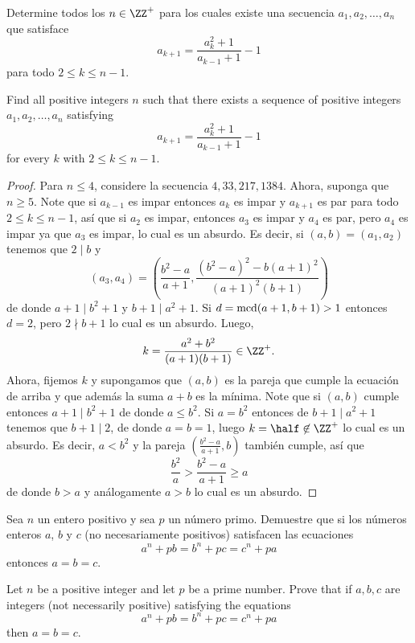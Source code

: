 \begin{probEG}[ISL 2009/N4]
  Determine todos los $n\in\ZZ^+$ para los cuales existe una secuencia
  $a_1,a_2,\dots,a_n$ que satisface
  \[a_{k+1}=\frac{a_k^2+1}{a_{k-1}+1}-1\]
  para todo $2\le k\le n-1$.
  \begin{hint}
    Find all positive integers $n$ such that there exists a sequence of positive
    integers $a_1,a_2,\dots,a_n$ satisfying
    \[a_{k+1}=\frac{a_k^2+1}{a_{k-1}+1}-1\]
    for every $k$ with $2\le k\le n-1$.
  \end{hint}
\end{probEG}

\begin{proof}
  Para $n\le 4$, considere la secuencia $4,33,217,1384$. Ahora, suponga que
  $n\ge 5$. Note que si $a_{k-1}$ es impar entonces $a_k$ es impar y $a_{k+1}$
  es par para todo $2\le k\le n-1$, así que si $a_2$ es impar, entonces $a_3$ es
  impar y $a_4$ es par, pero $a_4$ es impar ya que $a_3$ es impar, lo cual es un
  absurdo. Es decir, si $(a,b)=(a_1,a_2)$ tenemos que $2\mid b$ y
  \[
    (a_3,a_4)
    =\left(\frac{b^2-a}{a+1},\frac{(b^2-a)^2-b(a+1)^2}{(a+1)^2(b+1)}\right)
  \]
  de donde $a+1\mid b^2+1$ y $b+1\mid a^2+1$. Si $d=\operatorname{mcd}(a+1,b+1)>1$ entonces
  $d=2$, pero $2\nmid b+1$ lo cual es un absurdo. Luego,
  \[k=\frac{a^2+b^2}{(a+1)(b+1)}\in\ZZ^+.\]
  Ahora, fijemos $k$ y supongamos que $(a,b)$ es la pareja que cumple la
  ecuación de arriba y que además la suma $a+b$ es la mínima. Note que si
  $(a,b)$ cumple entonces $a+1\mid b^2+1$ de donde $a\le b^2$. Si $a=b^2$
  entonces de $b+1\mid a^2+1$ tenemos que $b+1\mid 2$, de donde $a=b=1$, luego
  $k=\half\not\in\ZZ^+$ lo cual es un absurdo. Es decir, $a<b^2$ y la pareja
  $\left(\frac{b^2-a}{a+1},b\right)$ también cumple, así que
  \[\frac{b^2}{a}>\frac{b^2-a}{a+1}\ge a\]
  de donde $b>a$ y análogamente $a>b$ lo cual es un absurdo.
\end{proof}

\begin{probEB}[ISL 2008/N1]
  Sea $n$ un entero positivo y sea $p$ un número primo. Demuestre que si los
  números enteros $a$, $b$ y $c$ (no necesariamente positivos) satisfacen las
  ecuaciones
  \[a^n+pb=b^n+pc=c^n+pa\]
  entonces $a=b=c$.
  \begin{hint}
    Let $n$ be a positive integer and let $p$ be a prime number. Prove that if
    $a,b,c$ are integers (not necessarily positive) satisfying the equations
    \[a^n+pb=b^n+pc=c^n+pa\]
    then $a=b=c$.
  \end{hint}
\end{probEB}

